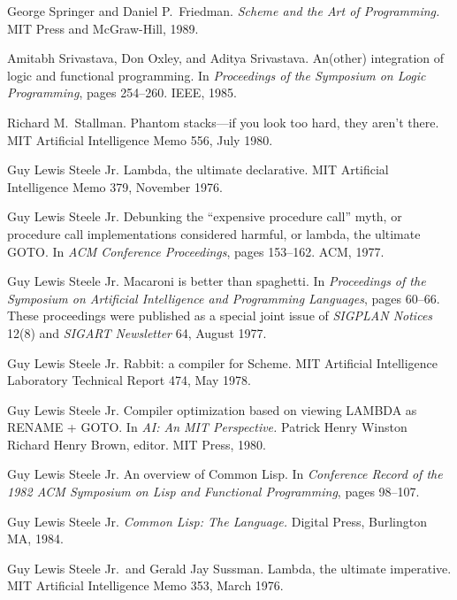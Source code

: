 \begin{thebibliography}{999}
George Springer and Daniel P.~Friedman.
{\em Scheme and the Art of Programming.}
MIT Press and McGraw-Hill, 1989.

Amitabh Srivastava, Don Oxley, and Aditya Srivastava.
An(other) integration of logic and functional programming.
In {\em Proceedings of the Symposium on Logic Programming}, pages 254--260. 
IEEE, 1985.


Richard M.~Stallman.
Phantom stacks---if you look too hard, they aren't there.
MIT Artificial Intelligence Memo 556, July 1980.


Guy Lewis Steele Jr.
Lambda, the ultimate declarative.
MIT Artificial Intelligence Memo 379, November 1976.

Guy Lewis Steele Jr.
Debunking the ``expensive procedure call'' myth, or procedure call
  implementations considered harmful, or lambda, the ultimate GOTO.
In {\em ACM Conference Proceedings}, pages 153--162.
ACM, 1977.

Guy Lewis Steele Jr.
Macaroni is better than spaghetti.
In {\em Proceedings of the Symposium on Artificial Intelligence and
  Programming Languages}, pages 60--66.
These proceedings were published as a special joint issue of {\em
  SIGPLAN Notices} 12(8) and {\em SIGART Newsletter} 64, August 1977.

Guy Lewis Steele Jr.
Rabbit: a compiler for Scheme.
MIT Artificial Intelligence Laboratory Technical Report 474, May 1978.

Guy Lewis Steele Jr.
Compiler optimization based on viewing LAMBDA as RENAME + GOTO.
In {\em AI: An MIT Perspective.}
Patrick Henry Winston Richard Henry Brown, editor.
MIT Press, 1980.

Guy Lewis Steele Jr.
An overview of Common Lisp.
In {\em Conference Record of the 1982 ACM Symposium on Lisp and
  Functional Programming}, pages 98--107.

Guy Lewis Steele Jr.
{\em Common Lisp: The Language.}
Digital Press, Burlington MA, 1984.

Guy Lewis Steele Jr.~and Gerald Jay Sussman.
Lambda, the ultimate imperative.
MIT Artificial Intelligence Memo 353, March 1976.


\end{thebibliography}
